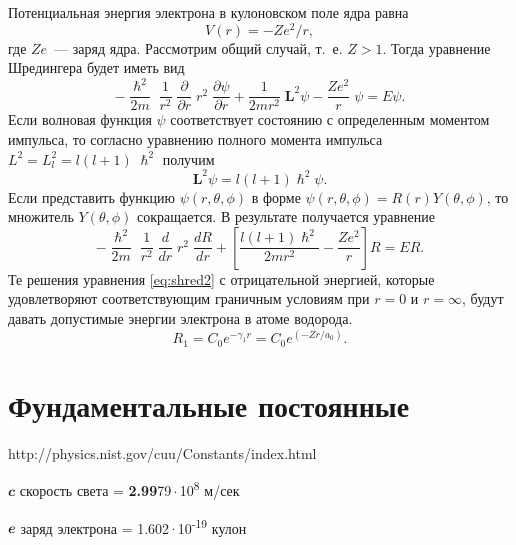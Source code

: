 \documentclass[a4paper,14pt, openany, twoside, draft]{extbook} %
\newcommand{\vect}[1]{\mathbf{#1}}
\begin{document}
Потенциальная энергия электрона в кулоновском поле ядра равна
\begin{equation}
  \label{eq:potenergy}
V(r)=-Ze^2/r,
\end{equation}
где $Ze$~--- заряд ядра.  Рассмотрим общий случай, т.~е. $Z>1$.  Тогда уравнение Шредингера будет иметь вид
\begin{equation}
  \label{eq:shred1}
-\frac{\hslash^2}{2m}\;\frac{1}{r^2}\;\frac{\partial}{\partial r}\;r^2\;\frac{\partial \psi}{\partial r}+\frac{1}{2mr^2}\;{\mathbf{L}}^2\psi-\frac{Ze^2}{r}\;\psi=E\psi.
\end{equation}
Если волновая функция $\psi$ соответствует состоянию с определенным моментом импульса, то согласно уравнению полного момента импульса $L^2=L_{l}^2=l(l+1)\;\hslash^2$ получим
\begin{equation}
  \label{eq:impuls}
{\vect{L}}^2\psi=l(l+1)\hslash^2\psi.
\end{equation}
Если представить функцию $\psi(r, \theta, \phi)$ в форме $\psi (r, \theta, \phi)=R(r)Y(\theta, \phi)$, то множитель $Y(\theta, \phi)$ сокращается.  В результате получается уравнение
\begin{equation}
  \label{eq:shred2}
-\frac{\hslash^2}{2m}\;\frac{1}{r^2}\;\frac{d}{dr}\;r^2\;\frac{dR}{dr}+
\left[\frac{l(l+1)\hslash^2}{2mr^2}-\frac{Ze^2}{r}\right]R=ER.
\end{equation}
Те решения уравнения \ref{eq:shred2} с отрицательной энергией, которые удовлетворяют соответствующим граничным условиям при $r=0$ и $r=\infty$, будут давать допустимые энергии электрона в атоме водорода.
\begin{equation}
  \label{eq:wavefunction}
R_1=C_0e^{-\gamma_1r}=C_0e^{(-{Zr}/{a_0})}.
\end{equation}

\newpage
\chapter*{Фундаментальные постоянные}
{http://physics.nist.gov/cuu/Constants/index.html}


$\mathbfit{c}$  скорость света =  \textbf{2.99}79\,$\cdot$\,10\textsuperscript{8} м/сек %

$\mathbfit{e}$  заряд электрона = 1.602\,$\cdot$\,10\textsuperscript{-19} кулон
\end{document}
